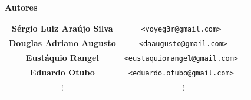 \documentclass[10pt,a4paper,openany]{book}
\begin{document}
\begin{center}
{\Huge \bf Autores}

\vspace{2cm}

\begin{tabular}{cc}

\bf Sérgio Luiz Araújo Silva & \tt <voyeg3r@gmail.com> \\
\bf Douglas Adriano Augusto & \tt <daaugusto@gmail.com>\\
\bf Eustáquio Rangel & \tt <eustaquiorangel@gmail.com> \\
\bf Eduardo Otubo & \tt <eduardo.otubo@gmail.com> \\
$\vdots$ & $\vdots$ \\

\end{tabular}

\end{center}

\newpage
\tableofcontents

\setcounter{page}{0} %
































\end{document}
